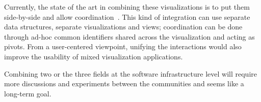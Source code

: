 Currently, the state of the art in combining these visualizations is
to put them side-by-side and allow coordination~\cite{vrvis}.  This
kind of integration can use separate data structures, separate
visualizations and views; coordination can be done through ad-hoc
common identifiers shared across the visualization and acting as
pivots.  From a user-centered viewpoint, unifying the interactions
would also improve the usability of mixed visualization applications.

Combining two or the three fields at the software infrastructure
level will require more discussions and experiments between the
communities and seems like a long-term goal.
